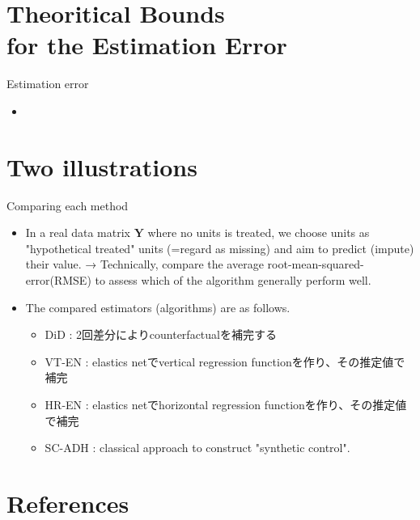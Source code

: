 \documentclass[xcolor=svgnames,aspectratio=169]{beamer}
\begin{document}
\section{Theoritical Bounds \\ for the Estimation Error}

\begin{frame}{Estimation error}
    \begin{itemize}
        \item 
    \end{itemize}
\end{frame}

\section{Two illustrations}

\begin{frame}{Comparing each method}
    \begin{itemize}
        \item In a real data matrix $\mathbf{Y}$ where \alert{no units is treated}, we choose units as "hypothetical treated" units (=regard as missing) and aim to predict (impute) their value.
        → Technically, compare the average root-mean-squared-error(RMSE) to assess which of the algorithm generally perform well.
        \item The compared estimators (algorithms) are as follows.
        \begin{itemize}
            \item DiD : 2回差分によりcounterfactualを補完する
            \item VT-EN : elastics netでvertical regression functionを作り、その推定値で補完
            \item HR-EN : elastics netでhorizontal regression functionを作り、その推定値で補完
            \item SC-ADH : classical approach to construct "synthetic control".
        \end{itemize}
    \end{itemize}
\end{frame}

\section{References}
\end{document}
